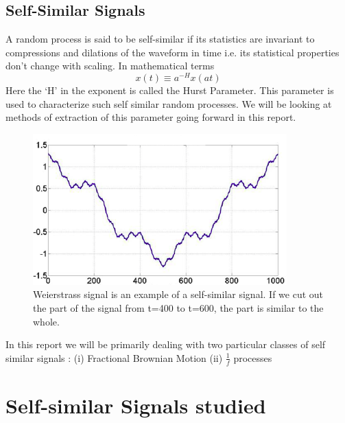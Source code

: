 \documentclass[a4paper]{article}
\begin{document}
\subsection{Self-Similar Signals}
A random process is said to be self-similar if its statistics are invariant to compressions and dilations of the waveform in time i.e. its statistical properties don’t change with scaling. In mathematical terms
$$x(t) \equiv a^{-H}x(at)$$
Here the ‘H’ in the exponent is called the Hurst Parameter. This parameter is used to characterize such self similar random processes. We will be looking at methods of extraction of this parameter going forward in this report.

\begin{figure}[h]
  \begin{minipage}[c]{0.67\textwidth}
    \includegraphics[width=\textwidth]{self_sim.png}
  \end{minipage}\hfill
  \begin{minipage}[c]{0.3\textwidth}
    \caption{
       Weierstrass signal is an example of a self-similar signal. If we cut out the part of the signal from t=400 to t=600, the part is similar to the whole.
    } 
  \end{minipage}
\end{figure}

In this report we will be primarily dealing with two particular classes of self similar signals :
(i) Fractional Brownian Motion  (ii) $\frac{1}{f}$ processes

\section{Self-similar Signals studied}
\end{document}
